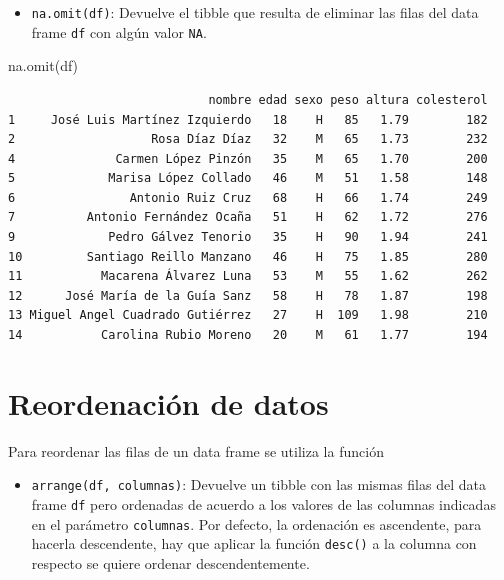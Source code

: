 \documentclass[
  a4paper,
]{scrreport}
\newenvironment{Shaded}{\begin{snugshade}}{\end{snugshade}}
\newcommand{\FunctionTok}[1]{\textcolor[rgb]{0.28,0.35,0.67}{#1}}
\newcommand{\NormalTok}[1]{\textcolor[rgb]{0.00,0.23,0.31}{#1}}
\providecommand{\tightlist}{%
  \setlength{\itemsep}{0pt}\setlength{\parskip}{0pt}}\usepackage{longtable,booktabs,array}
\theoremstyle{definition}
\theoremstyle{definition}
\theoremstyle{remark}
\begin{document}
\begin{itemize}
\tightlist
\item
  \texttt{na.omit(df)}: Devuelve el tibble que resulta de eliminar las
  filas del data frame \texttt{df} con algún valor \texttt{NA}.
\end{itemize}

\begin{Shaded}
\begin{Highlighting}[]
\FunctionTok{na.omit}\NormalTok{(df)}
\end{Highlighting}
\end{Shaded}

\begin{verbatim}
                            nombre edad sexo peso altura colesterol
1     José Luis Martínez Izquierdo   18    H   85   1.79        182
2                   Rosa Díaz Díaz   32    M   65   1.73        232
4              Carmen López Pinzón   35    M   65   1.70        200
5             Marisa López Collado   46    M   51   1.58        148
6                Antonio Ruiz Cruz   68    H   66   1.74        249
7          Antonio Fernández Ocaña   51    H   62   1.72        276
9             Pedro Gálvez Tenorio   35    H   90   1.94        241
10         Santiago Reillo Manzano   46    H   75   1.85        280
11           Macarena Álvarez Luna   53    M   55   1.62        262
12      José María de la Guía Sanz   58    H   78   1.87        198
13 Miguel Angel Cuadrado Gutiérrez   27    H  109   1.98        210
14           Carolina Rubio Moreno   20    M   61   1.77        194
\end{verbatim}

\hypertarget{reordenaciuxf3n-de-datos}{%
\section{Reordenación de datos}\label{reordenaciuxf3n-de-datos}}

Para reordenar las filas de un data frame se utiliza la función

\begin{itemize}
\tightlist
\item
  \texttt{arrange(df,\ columnas)}: Devuelve un tibble con las mismas
  filas del data frame \texttt{df} pero ordenadas de acuerdo a los
  valores de las columnas indicadas en el parámetro \texttt{columnas}.
  Por defecto, la ordenación es ascendente, para hacerla descendente,
  hay que aplicar la función \texttt{desc()} a la columna con respecto
  se quiere ordenar descendentemente.
\end{itemize}
\end{document}
